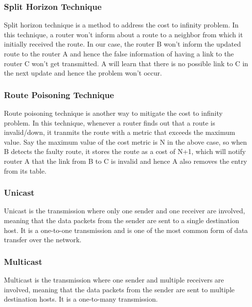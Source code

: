 \documentclass{home_assignment}
\begin{document}
  \subsubsection*{Split Horizon Technique}
  Split horizon technique is a method to address the cost to infinity problem. In this technique, a router won't inform about a route to a neighbor from which it initially received the route. In our case, the router B won't inform the updated route to the router A and hence the false information of having a link to the router C won't get transmitted. A will learn that there is no possible link to C in the next update and hence the problem won't occur.
  \subsubsection*{Route Poisoning Technique}
  Route poisoning technique is another way to mitigate the cost to infinity problem. In this technique, whenever a router finds out that a route is invalid/down, it tranmits the route with a metric that exceeds the maximum value. Say the maximum value of the cost metric is N in the above case, so when B detects the faulty route, it stores the route as a cost of N+1, which will notify router A that the link from B to C is invalid and hence A also removes the entry from its table.  
\subsubsection*{Unicast}
Unicast is the transmission where only one sender and one receiver are involved, meaning that the data packets from the sender are sent to a single destination host. It is a one-to-one transmission and is one of the most common form of data transfer over the network.
\subsubsection*{Multicast}
Multicast is the transmission where one sender and multiple receivers are involved, meaning that the data packets from the sender are sent to multiple destination hosts. It is a one-to-many transmission.
\end{document}
